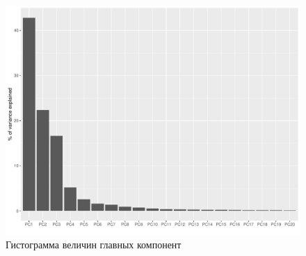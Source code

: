 \documentclass[a4paper]{article}
\begin{document}
\begin{figure}[H]
    \centering
    \includegraphics[width = \textwidth]{hists/hist_for_Herbert_von_Karajan.pdf}
    \caption{Гистограмма величин главных компонент}
    \label{fig:hvk_hist}
\end{figure}
\end{document}
